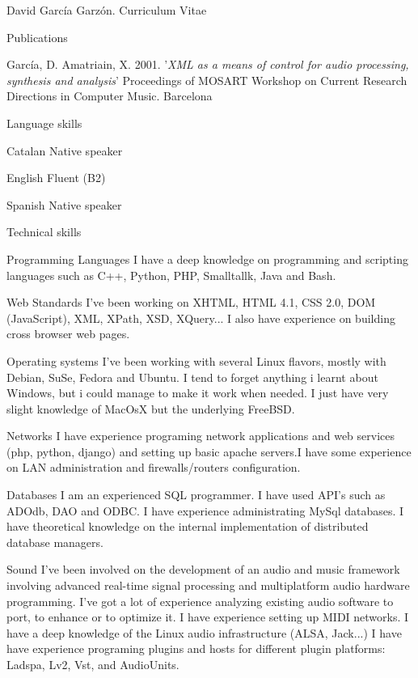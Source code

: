 \documentclass{article}
\begin{document}
\begin{cv}{David García Garzón. Curriculum Vitae}
\begin{cvlist}{Publications}
\item[] {\sc García, D. Amatriain, X.} 2001.
'{\em XML as a means of control for audio processing, synthesis and analysis}'
Proceedings of MOSART Workshop on Current Research Directions in Computer Music. Barcelona
	
\end{cvlist}


\begin{cvlist}{Language skills}
\item[Catalan] Native speaker
\item[English] Fluent (B2)
\item[Spanish] Native speaker

\end{cvlist}

\begin{cvlist}{Technical skills}

\item[Programming Languages]
	I have a deep knowledge on programming and scripting languages such  as C++, Python, PHP, Smalltallk, Java and Bash. 

\item[Web Standards]
	I've been working on XHTML, HTML 4.1, CSS 2.0, DOM (JavaScript), XML, XPath, XSD, XQuery... I also have experience on building cross browser web pages.

\item[Operating systems]
	I've been working with several Linux flavors, mostly with Debian, SuSe, Fedora and Ubuntu. I tend to forget anything i learnt about Windows, but i could manage to make it work when needed. I just have very slight knowledge of MacOsX but the underlying FreeBSD.

\item[Networks]
	I have experience programing network applications and web services (php, python, django) and setting up basic apache servers.I have some experience on LAN administration and firewalls/routers configuration. 

\item[Databases]
	I am an experienced SQL programmer. I have used API's such as ADOdb, DAO and ODBC. I have experience administrating MySql databases. I have theoretical knowledge on the internal implementation of distributed database managers. 

\item[Sound]
	I've been involved on the development of an audio and music framework involving advanced real-time signal processing and multiplatform audio hardware programming. I've got a lot of experience analyzing existing audio software to port, to enhance or to optimize it. I have experience setting up MIDI networks. I have a deep knowledge of the Linux audio infrastructure (ALSA, Jack...) I have have experience programing plugins and hosts for different plugin platforms: Ladspa, Lv2, Vst, and AudioUnits. 


\end{cvlist}
\end{cv}
\end{document}
